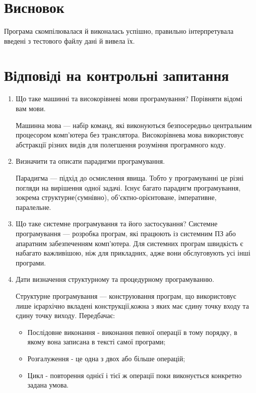 \documentclass[a4paper, 12pt, oneside]{extarticle}
\begin{document}
\section*{Висновок}
Програма скомпілювалася й виконалась успішно, правильно
інтерпретувала введені з тестового файлу дані й вивела їх.

\section*{Відповіді на контрольні запитання}
\begin{enumerate}
\item Що таке машинні та високорівневі мови програмування? Порівняти відомі вам мови.

Машинна мова --- набір команд, які виконуються безпосередньо центральним процесором
		комп'ютера без транслятора. Високорівнева мова використовує абстракції
		різних видів для полегшення розуміння програмного коду.

\item Визначити та описати парадигми програмування.

Парадигма --- підхід до осмислення явища. Тобто у програмуванні це різні погляди
		на вирішення одної задачі. Існує багато парадигм програмування, зокрема структурне(сумнівно),
об'єктно-орієнтоване, імперативне, паралельне.

\item Що таке системне програмування та його застосування?
	Системне програмування --- розробка програм, які працюють із системним ПЗ або
	апаратним забезпеченням комп'ютера. Для системних програм швидкість є набагато
	важливішою, ніж для прикладних, адже вони обслуговують усі інші програми.

\item Дати визначення структурному та процедурному програмуванню.

Структурне програмування --- конструювання програм, що використовує лише ієрархічно вкладені конструкції,кожна з яких має єдину точку входу та єдину точку виходу. Передбачає:

		\begin{itemize}
\item	Послідовне виконання - виконання певної операції в тому порядку, в якому вона записана в тексті самої програми;
\item	Розгалуження - це одна з двох або більше операцій;
\item	Цикл - повторення однієї і тієї ж операції поки виконується конкретно задана умова.
		\end{itemize}


\end{enumerate}
\end{document}
